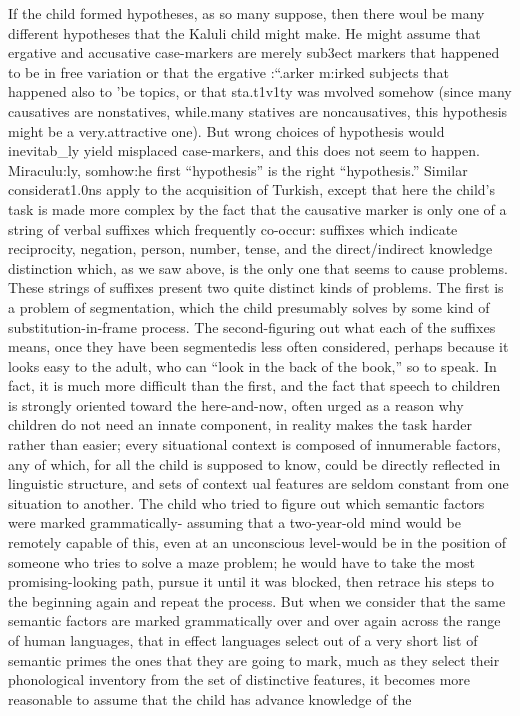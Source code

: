 If the child formed hypotheses, as so many suppose, then there woul be many different hypotheses that the Kaluli child might make. He might assume that ergative and accusative case-markers are merely sub3ect markers that happened to be in free variation or that the ergative :``.arker m:irked subjects that happened also to 'be topics, or that sta.t1v1ty was mvolved somehow (since many causatives are non\-statives, while.many statives are noncausatives, this hypothesis might be a very.attractive one). But wrong choices of hypothesis would inevit\-ab\_ly yield misplaced case-markers, and this does not seem to happen. Miraculu:ly, somhow:he first ``hypothesis'' is the right ``hypothesis.'' Similar considerat1.0ns apply to the acquisition of Turkish, except
that here the child's task is made more complex by the fact that the causative marker is only one of a string of verbal suffixes which frequently co-occur: suffixes which indicate reciprocity, negation, person, number, tense, and the direct/indirect knowledge distinction which, as we saw above, is the only one that seems to cause problems. These strings of suffixes present two quite distinct kinds of problems. The first is a problem of segmentation, which the child presumably solves by some kind of substitution-in-frame process. The second-figuring out what each of the suffixes means, once they have been segmented\-is less often considered, perhaps because it looks easy to the adult, who can ``look in the back of the book,'' so to speak. In fact, it is much more difficult than the first, and the fact that speech to children is strongly oriented toward the here-and-now, often urged as a reason why children do not need an innate component, in reality makes the task harder rather than easier; every situational context is composed of innumerable factors, any of which, for all the child is supposed to know, could be directly reflected in linguistic structure, and sets of context ual features are seldom constant from one situation to another. The child who tried to figure out which semantic factors were marked grammatically- assuming that a two-year-old mind would be remotely capable of this, even at an unconscious level-would be in the position of someone who tries to solve a maze problem; he would have to take the most promising-looking path, pursue it until it was blocked, then retrace his steps to the beginning again and repeat the process. But when we consider that the same semantic factors are marked gram\-matically over and over again across the range of human languages, that in effect languages select out of a very short list of semantic primes the ones that they are going to mark, much as they select their phonological inventory from the set of distinctive features, it becomes more reasonable to assume that the child has advance knowledge of the
